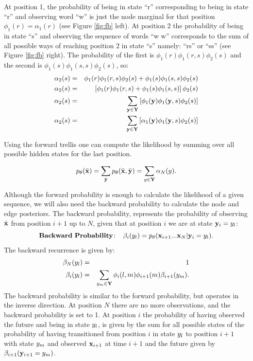 At position 1, the probability of being in state ``r'' corresponding
to being in state ``r'' and observing word ``w'' is just the node
marginal for that position $\phi_1(r) = \alpha_1(r)$ (see Figure
 \ref{fig:fb} left). At position 2 the probability
of being in state ``s'' and observing the sequence of words ``w w''
corresponds to the sum of all possible ways of reaching position 2 in
state ``s'' namely: ``rs'' or ``ss'' (see Figure \ref{fig:fb} right). The probability of the first is
$\phi_1(r)\phi_1(r,s)\phi_2(s)$
and the second is $\phi_1(s)\phi_1(s,s)\phi_2(s)$, so:
\begin{eqnarray*}
   \alpha_2(s) &=& \phi_1(r)\phi_1(r,s)\phi_2(s) +
   \phi_1(s)\phi_1(s,s)\phi_2(s) \\
   \alpha_2(s) &=& \left[\phi_1(r)\phi_1(r,s) +
   \phi_1(s)\phi_1(s,s) \right]\phi_2(s) \\
 \alpha_2(s) &=& \displaystyle \sum_{\mathbf{y} \in \mathbf{Y}}
 \left[\phi_1(\mathbf{y})\phi_1(\mathbf{y},s)\phi_2(s) \right] \\
  \alpha_2(s) &=& \displaystyle \sum_{\mathbf{y} \in \mathbf{Y}}
 \left[\alpha_1(\mathbf{y})\phi_1(\mathbf{y},s)\phi_2(s) \right]
\end{eqnarray*}

Using the forward trellis one can compute the likelihood by summing
over all possible hidden states for the last position.

\begin{equation}
\label{eq:forwardSum}
p_{\theta}(\bar{\mathbf{x}}) = \displaystyle \sum_{\bar{\mathbf{y}}} p_{\theta}(\bar{\mathbf{x}} ,\bar{\mathbf{y}}) = \displaystyle \sum_{{y} \in \mathbf{Y}} \alpha_N({y}) .
\end{equation}

Although the forward probability is enough to calculate the likelihood
of a given sequence, we will also need the backward probability to
calculate the node and edge posteriors. The backward probability,
represents the probability of observing $\bar{\mathbf{x}}$ from position $i+1$ up to $N$, given that at position $i$ we are at state $\mathbf{y}_i = {y}_l$:
 \begin{equation}
\label{eq::backward}
\mathbf{Backward \ Probability\!:}\;\;\;\;  \beta_i({y}_l) = p_{\theta}(\mathbf{x}_{i+1}...\mathbf{x}_N | \mathbf{y}_i = {y}_l).
\end{equation}
The backward recurrence is given by:
\begin{eqnarray}
\beta_N({y}_l) &=& 1 \\
\beta_i({y}_l) &=& \displaystyle \sum_{{y}_m \in \mathbf{Y}} \phi_i(l,m)\phi_{i+1}(m) \beta_{i+1}({y}_m).
\end{eqnarray}
The backward probability is similar to the forward probability, but operates in the inverse direction.
At position $N$ there are no more observations, and the backward
probability is set to 1. At position $i$ the probability 
of having observed the future and being in state ${y}_l$, is given by the sum for all possible states of the probability of having transitioned 
from position $i$ in state ${y}_l$ to position $i+1$ with state ${y}_m$ and observed $\mathbf{x}_{i+1}$ at time $i+1$ and the future given by  $\beta_{i+1}(\mathbf{y}_{i+1} = {y}_m)$. 

